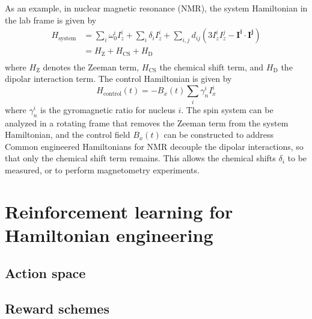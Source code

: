 \documentclass[twocolumn, aps, prd]{revtex4-2}
\begin{document}
As an example, in nuclear magnetic resonance (NMR), the system Hamiltonian
in the lab frame
is given by
\begin{align}\label{eq:ham_spin}
    H_\text{system} &= \sum_i \omega_0^i I_z^i
        + \sum_i \delta_i I_z^i
        + \sum_{i,j} d_{ij}
            \left( 3I_z^iI_z^j - \mathbf{I^i} \cdot \mathbf{I^j} \right) \\
    &= H_\text{Z} + H_\text{CS} + H_\text{D} \\
\end{align} %
where $H_\text{Z}$ denotes the Zeeman term, $H_\text{CS}$ the chemical shift term, and $H_\text{D}$ the dipolar interaction term.
The control Hamiltonian is given by
\begin{equation}
    H_\text{control}(t) = -B_x(t) \sum_i \gamma_n^i I_x^i
\end{equation}
where $\gamma_n^i$ is the gyromagnetic ratio for nucleus $i$.
The spin system can be analyzed in a rotating frame that removes the Zeeman term from the system Hamiltonian, and the control field $B_x(t)$ can be constructed to address 
Common engineered Hamiltonians for NMR decouple the dipolar interactions, so that only the chemical shift term remains. This allows the chemical shifts $\delta_i$ to be measured, or to perform magnetometry experiments.


\section{Reinforcement learning for Hamiltonian engineering}


\subsection{Action space}


\subsection{Reward schemes}
\end{document}

